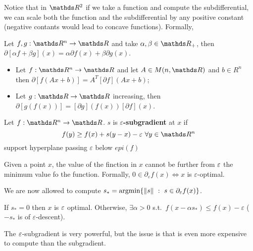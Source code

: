 \documentclass[computational_mathematics.tex]{subfiles}
\begin{document}
Notice that in $\R^2$ if we take a function and compute the subdifferential, we can scale both the function and the subdifferential by any positive constant (negative contants would lead to concave functions). Formally,

\begin{proposition}
Let $f,g: \R^n \to \R$ and take $\alpha, \beta \in \R_+$, then $\partial [\alpha f + \beta g](x) = \alpha \partial f(x) + \beta \partial g(x)$.
\end{proposition}

\begin{proposition}
  \begin{itemize}
    \item Let $f: \R^n \to \R$ and let $A \in M(n, \R)$ and $b \in R^n$ then $\partial [f(Ax + b)] = A^T [\partial f](Ax + b) $;
    \item Let $g:\R \to \R$ increasing, then $\partial [g(f(x))] = [\partial g](f(x)) [\partial f](x)$.
  \end{itemize}
\end{proposition}

\begin{definition}
  Let $f: \R^n \to \R$. $s$ is $\varepsilon$\textbf{-subgradient} at $x$ if 
\[
  f(y) \geq f(x) + s (y - x) - \varepsilon~ \forall y \in \R^n
\]
support hyperplane passing $\varepsilon$ below $epi(f)$
\end{definition}

\begin{proposition}
Given a point $x$, the value of the finction in $x$ cannot be further from $\varepsilon$ the minimum value fo the function.
  Formally, $0 \in \partial_\varepsilon f(x) \iff x$ is $\varepsilon$-optimal. 
\end{proposition}

We are now allowed to compute $s_* = \mbox{argmin} \{\left\lVert s\right\rVert~:~ s \in \partial_\varepsilon f(x)\}$.

If $s_* = 0$ then $x$ is $\varepsilon$ optimal. Otherwise, $\exists \alpha > 0$ s.t.~$f(x - \alpha s_*) \leq f(x) - \varepsilon$ ($- s_*$ is of $\varepsilon$-descent).

The $\varepsilon$-subgradient is very powerful, but the issue is that is even more expensive to compute than the subgradient.
\end{document}
